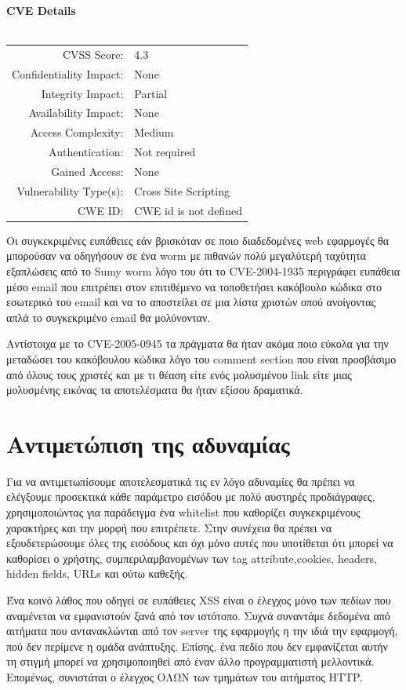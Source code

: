 \textbf{CVE Details}\\ \\
\begin{tabular}{rl}
\hline
CVSS Score: & 	4.3\\
Confidentiality Impact: & \noindent None \\
Integrity Impact: & Partial \\
Availability Impact:  &	None \\
Access Complexity: &	Medium \\
Authentication: 	& Not required \\
Gained Access: 	& None\\
Vulnerability Type(s): & 	Cross Site Scripting	\\
CWE ID: &	CWE id is not defined \\
\hline
\end{tabular}


\noindent
Οι συγκεκριμένες ευπάθειες εάν βρισκόταν σε ποιο διαδεδομένες web εφαρμογές θα μπορούσαν να οδηγήσουν σε ένα worm με πιθανών πολύ μεγαλύτερή ταχύτητα εξαπλώσεις από το Sumy worm λόγο του ότι το CVE-2004-1935 περιγράφει ευπάθεια μέσο email που επιτρέπει στον επιτιθέμενο να τοποθετήσει κακόβουλο κώδικα στο εσωτερικό του email και να το αποστείλει σε μια λίστα χριστών οπού ανοίγοντας απλά το συγκεκριμένο email θα μολύνονταν.

\noindent
Αντίστοιχα με το CVE-2005-0945 τα πράγματα θα ήταν ακόμα ποιο εύκολα για την μεταδώσει του κακόβουλου κώδικα λόγο του comment section που είναι προσβάσιμο από όλους τους χριστές και με τι θέαση είτε ενός μολυσμένου link είτε μιας μολυσμένης εικόνας τα αποτελέσματα θα ήταν εξίσου δραματικά.


\section{Αντιμετώπιση της αδυναμίας}
\noindent
Για να αντιμετωπίσουμε αποτελεσματικά τις εν λόγο αδυναμίες θα πρέπει να ελέγξουμε προσεκτικά κάθε παράμετρο εισόδου με πολύ αυστηρές προδιάγραφες, χρησιμοποιώντας για παράδειγμα ένα whitelist που καθορίζει συγκεκριμένους χαρακτήρες και την μορφή που επιτρέπετε. Στην συνέχεια θα πρέπει να εξουδετερώσουμε όλες της εισόδους και όχι μόνο αυτές που υποτίθεται ότι μπορεί να καθορίσει ο χρήστης, συμπεριλαμβανομένων των tag attribute,cookies, headers, hidden fields, URLs και ούτω καθεξής. 

\noindent
Ένα κοινό λάθος που οδηγεί σε ευπάθειες XSS είναι ο έλεγχος μόνο των πεδίων που αναμένεται να εμφανιστούν ξανά από τον ιστότοπο. Συχνά συναντάμε δεδομένα από αιτήματα που αντανακλώνται από τον server της εφαρμογής η την ιδιά την εφαρμογή, πού δεν περίμενε  η ομάδα ανάπτυξης. Επίσης, ένα πεδίο που δεν εμφανίζεται αυτήν τη στιγμή μπορεί να χρησιμοποιηθεί από έναν άλλο προγραμματιστή μελλοντικά. Επομένως, συνιστάται ο έλεγχος ΟΛΩΝ των τμημάτων του αιτήματος HTTP.

